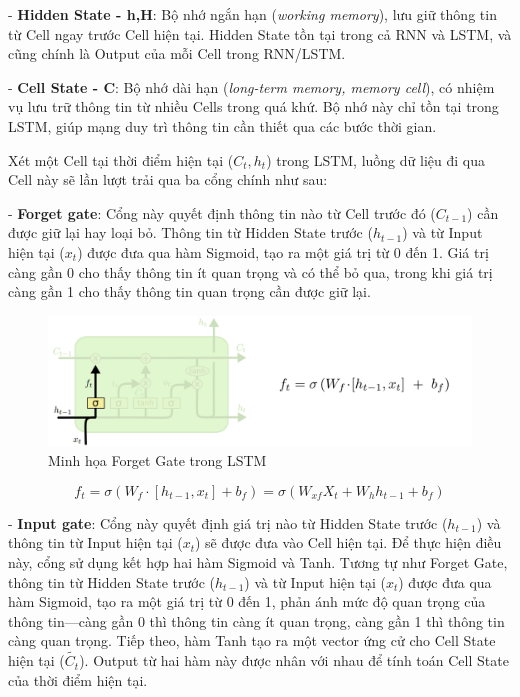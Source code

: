 - \textbf{Hidden State - h,H}: Bộ nhớ ngắn hạn (\textit{working memory}), lưu giữ thông tin từ Cell ngay trước Cell hiện tại. Hidden State tồn tại trong cả RNN và LSTM, và cũng chính là Output của mỗi Cell trong RNN/LSTM.

- \textbf{Cell State - C}: Bộ nhớ dài hạn (\textit{long-term memory, memory cell}), có nhiệm vụ lưu trữ thông tin từ nhiều Cells trong quá khứ. Bộ nhớ này chỉ tồn tại trong LSTM, giúp mạng duy trì thông tin cần thiết qua các bước thời gian.

Xét một Cell tại thời điểm hiện tại (\(C_t, h_t\)) trong LSTM, luồng dữ liệu đi qua Cell này sẽ lần lượt trải qua ba cổng chính như sau:

- \textbf{Forget gate}: Cổng này quyết định thông tin nào từ Cell trước đó (\(C_{t-1}\)) cần được giữ lại hay loại bỏ. Thông tin từ Hidden State trước (\(h_{t-1}\)) và từ Input hiện tại (\(x_t\)) được đưa qua hàm Sigmoid, tạo ra một giá trị từ 0 đến 1. Giá trị càng gần 0 cho thấy thông tin ít quan trọng và có thể bỏ qua, trong khi giá trị càng gần 1 cho thấy thông tin quan trọng cần được giữ lại.

\begin{figure}[h!]
    \centering
    \includegraphics[width=\textwidth]{images/LSTM/lstm-forget-f.png}
    \caption{Minh họa Forget Gate trong LSTM}
    \label{fig:lstm_cell}
\end{figure}

\begin{equation*}
    f_t = \sigma \left( W_f \cdot [h_{t-1}, x_t] + b_f \right) = \sigma (W_{xf} X_t + W_h h_{t-1} + b_f)
\end{equation*}

- \textbf{Input gate}: Cổng này quyết định giá trị nào từ Hidden State trước (\(h_{t-1}\)) và thông tin từ Input hiện tại (\(x_t\)) sẽ được đưa vào Cell hiện tại. Để thực hiện điều này, cổng sử dụng kết hợp hai hàm Sigmoid và Tanh. Tương tự như Forget Gate, thông tin từ Hidden State trước (\(h_{t-1}\)) và từ Input hiện tại (\(x_t\)) được đưa qua hàm Sigmoid, tạo ra một giá trị từ 0 đến 1, phản ánh mức độ quan trọng của thông tin—càng gần 0 thì thông tin càng ít quan trọng, càng gần 1 thì thông tin càng quan trọng. Tiếp theo, hàm Tanh tạo ra một vector ứng cử cho Cell State hiện tại (\(\tilde{C_t}\)). Output từ hai hàm này được nhân với nhau để tính toán Cell State của thời điểm hiện tại.


